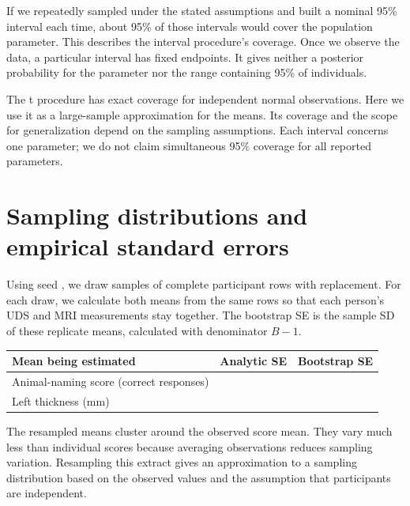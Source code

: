 \documentclass[11pt]{article}
\begin{document}
If we repeatedly sampled under the stated assumptions and built a nominal
95\% interval each time, about 95\% of those intervals would cover the
population parameter. This describes the interval procedure's coverage.
Once we observe the data, a particular interval has fixed endpoints.
It gives neither a posterior probability for the parameter nor the
range containing 95\% of individuals.

The t procedure has exact coverage for independent normal observations.
Here we use it as a large-sample approximation for the means. Its coverage
and the scope for generalization depend on the sampling assumptions.
Each interval concerns one parameter; we do not claim simultaneous 95\%
coverage for all reported parameters.

\clearpage
\section{Sampling distributions and empirical standard errors}
Using seed \MeansSeed{}, we draw \Replicates{} samples of \PairedN{}
complete participant rows with replacement. For each draw, we calculate
both means from the same rows so that each person's UDS and MRI measurements
stay together. The bootstrap SE is the sample SD of these replicate means,
calculated with denominator $B-1$.

\begin{center}\small
\begin{tabular}{@{}lrr@{}}
\toprule
Mean being estimated & Analytic SE & Bootstrap SE \\
\midrule
Animal-naming score (correct responses) & \ScoreSE{} & \ScoreBootSE{} \\
Left thickness (mm) & \ThicknessSE{} & \ThicknessBootSE{} \\
\bottomrule
\end{tabular}
\end{center}


The resampled means cluster around the observed score mean. They vary
much less than individual scores because averaging \PairedN{} observations
reduces sampling variation. Resampling this extract gives an approximation
to a sampling distribution based on the observed values and the assumption
that participants are independent.
\end{document}
